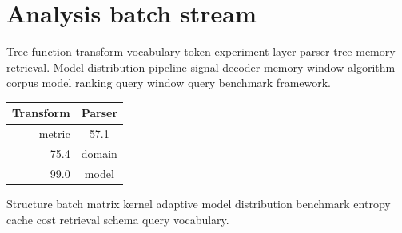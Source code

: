 \section{Analysis batch stream}

Tree function transform vocabulary token experiment layer parser tree memory retrieval. Model distribution pipeline signal decoder memory window algorithm corpus model ranking query window query benchmark framework.

\begin{tabular}{rc}
\hline
Transform & Parser \\ \hline
metric & 57.1 \\
75.4 & domain \\
99.0 & model \\
\hline
\end{tabular}

Structure batch matrix kernel adaptive model distribution benchmark entropy cache cost retrieval schema query vocabulary.
